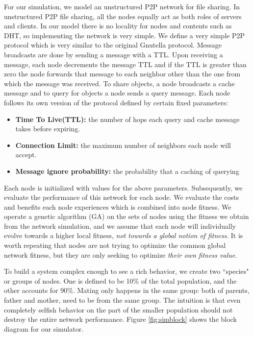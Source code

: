 \documentclass[12pt,journal,draftcls,letterpaper,onecolumn]{IEEEtran}
\begin{document}
For our simulation, we model an unstructured P2P network for file
sharing\cite{journals/comsur/LuaCPSL05}. In unstructured P2P file sharing, all the nodes
equally act as both roles of servers and clients.  In our model there is no
locality for nodes and contents such as DHT, so implementing the network is
very simple.  We define a very simple P2P protocol which is very similar to
the original Gnutella protocol.  Message broadcasts are done by sending a
message with a TTL.  Upon receiving a message, each node decrements the
message TTL and if the TTL is greater than zero the node forwards that message
to each neighbor other than the one from which the message was received.  To
share objects, a node broadcasts a cache message and to query for objects a
node sends a query message.  Each node follows its own version of the protocol
defined by certain fixed parameters:

\begin{itemize}
\item {\bf Time To Live(TTL):} the number of hops each query and cache message takes
before expiring.
\item {\bf Connection Limit:}
the maximum number of neighbors each node will accept.
\item {\bf Message ignore probability:}
the probability that a caching of querying 
\end{itemize}

Each node is initialized with values for the above parameters.  Subsequently,
we evaluate the performance of this network for each node.  We evaluate the
costs and benefits each node experiences which is combined into node fitness.
We operate a genetic algorithm (GA)\cite{genetic} on the sets of nodes using
the fitness we obtain from the network simulation, and we assume that each
node will individually evolve towards a higher local fitness, \emph{not
towards a global notion of fitness}.  It is worth repeating that nodes are not
trying to optimize the common global network fitness, but they are only
seeking to optimize \emph{their own fitness value}.

To build a system complex enough to see a rich behavior, we create two
``species" or groups of nodes.  One is defined to be 10\% of the total
population, and the other accounts for 90\%.
Mating only happens in the same group: both of parents, father and mother,
need to be from the same group.
The intuition is that even
completely selfish behavior on the part of the smaller population should not
destroy the entire network performance.
Figure \ref{fig:simblock} shows the block diagram for our simulator.
\end{document}
